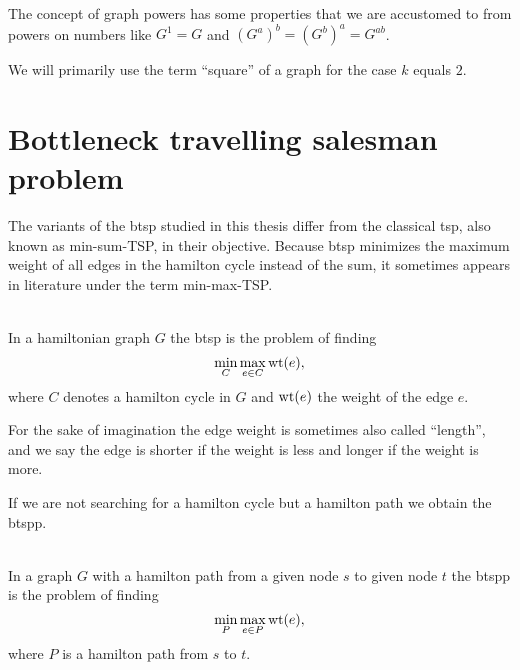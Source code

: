 The concept of graph powers has some properties that we are accustomed to from powers on numbers like \(G^1 = G\) and \({(G^a)}^b = {(G^b)}^a = G^{ab}\).

We will primarily use the term \enquote{square} of a graph for the case \(k\) equals \(2\).


\section{Bottleneck travelling salesman problem}
The variants of the \gls{btsp} studied in this thesis differ from the classical \gls{tsp}, also known as min-sum-TSP, in their objective. Because \gls{btsp} minimizes the maximum weight of all edges in the hamilton cycle instead of the sum, it sometimes appears in literature under the term min-max-TSP.

\begin{definition}\label{def:btsp}\ \\
  In a hamiltonian graph \(G\) the \gls{btsp} is the problem of finding
  \begin{equation*}
    \min\limits_{C} \max\limits_{e \in C} \textrm{wt}(e),
  \end{equation*}
  where \(C\) denotes a hamilton cycle in \(G\) and \(\textrm{wt}(e)\) the weight of the edge \(e\).
\end{definition}

For the sake of imagination the edge weight is sometimes also called \enquote{length}, and we say the edge is shorter if the weight is less and longer if the weight is more.

If we are not searching for a hamilton cycle but a hamilton path we obtain the \gls{btspp}.

\begin{definition}\label{def:btspp}\ \\
  In a graph \(G\) with a hamilton path from a given node \(s\) to given node \(t\) the \gls{btspp} is the problem of finding
  \begin{equation*}
    \min\limits_{P} \max\limits_{e \in P} \textrm{wt}(e),
  \end{equation*}
  where \(P\) is a hamilton path from \(s\) to \(t\).
\end{definition}
